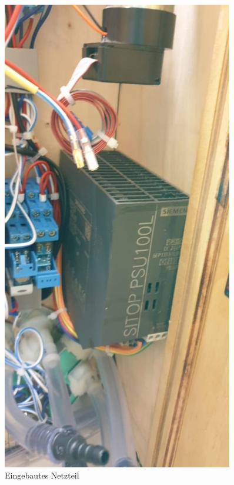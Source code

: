 \documentclass[10pt,a4paper]{report}
\begin{document}
	\begin{figure}
		\begin{minipage}[b]{.4\linewidth}
			\includegraphics[width=0.9\textwidth]{Netzteil 1}
			\centering
			\caption{Eingebautes Netzteil}
		\end{minipage}
		\hspace{.1\linewidth}
		\begin{minipage}[b]{.4\linewidth}

\end{minipage}
\end{figure}
\end{document}
